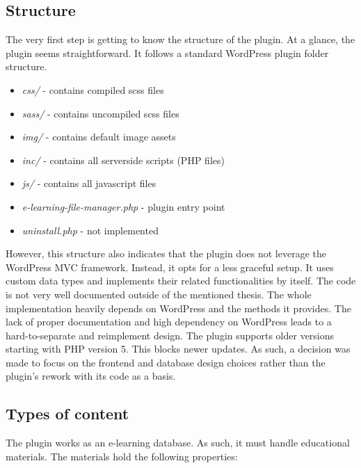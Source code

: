 \documentclass[
  digital,     %
  oneside,     %
  nosansbold,  %
  colorbold, %
  lof,         %
  lot,         %
]{fithesis4}
\begin{document}
\subsection{Structure}
\label{subsect:plugin-structure}

The very first step is getting to know the structure of the plugin. At a glance, the plugin seems straightforward. It follows a standard WordPress plugin folder structure.

\begin{itemize}
	\item \textit{css/} - contains compiled scss files
	\item \textit{sass/} - contains uncompiled scss files
	\item \textit{img/} - contains default image assets
	\item \textit{inc/} - contains all serverside scripts (PHP files)
	\item \textit{js/} - contains all javascript files
	\item \textit{e-learning-file-manager.php} - plugin entry point
	\item \textit{uninstall.php} - not implemented
\end{itemize}

However, this structure also indicates that the plugin does not leverage the WordPress MVC framework. Instead, it opts for a less graceful setup. It uses custom data types and implements their related functionalities by itself. The code is not very well documented outside of the mentioned thesis. The whole implementation heavily depends on WordPress and the methods it provides. The lack of proper documentation and high dependency on WordPress leads to a hard-to-separate and reimplement design. The plugin supports older versions starting with PHP version 5. This blocks newer updates. As such, a decision was made to focus on the frontend and database design choices rather than the plugin's rework with its code as a basis.

\subsection{Types of content}

The plugin works as an e-learning database. As such, it must handle educational materials. The materials hold the following properties:
\end{document}
